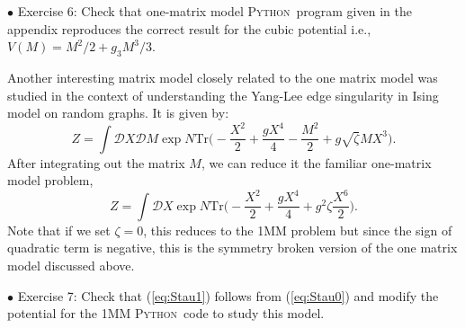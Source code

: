 \documentclass[letter,11pt]{article}
\newcommand{\PY}{\textsc{Python}}
\begin{document}
\begin{mdframed}[backgroundcolor=blue!3] 
	\textsc{} 
	$\bullet$ Exercise 6:  Check that one-matrix model \PY~program given in the appendix reproduces the correct result for the cubic potential 
	i.e., $V(M) = M^2/2 + g_{3}M^3/3$.  
	\label{ex:6} 
\end{mdframed} 
Another interesting matrix model closely related to the one matrix model was 
studied in the context of understanding the Yang-Lee edge singularity
\cite{Staudacher:1989fy} in Ising model on random graphs. 
It is given by: 
\begin{equation}
	\label{eq:Stau0}
	Z = \int \mathcal{D}X \mathcal{D}M \exp N \mbox{Tr}\Bigg(-\frac{X^2}{2} + \frac{gX^4}{4} - \frac{M^2}{2} + g \sqrt{\zeta} MX^3 \Bigg).
\end{equation}
After integrating out the matrix $M$, we can reduce it the familiar one-matrix model problem, 
\begin{equation}
	\label{eq:Stau1} 
	Z = \int \mathcal{D}X \exp N \mbox{Tr}\Bigg(-\frac{X^2}{2} + \frac{gX^4}{4} + g^2 \zeta  \frac{X^6}{2}   \Bigg).
\end{equation}
Note that if we set $\zeta=0$, this reduces to the 1MM problem but since the sign of 
quadratic term is negative, this is the symmetry broken version of the one matrix model 
discussed above. 
\begin{mdframed}[backgroundcolor=blue!3]  
	$\bullet$ Exercise 7: Check that (\ref{eq:Stau1}) follows from (\ref{eq:Stau0}) and modify the potential for the 1MM \PY~code to study this model. 
\end{mdframed} 
\end{document}
